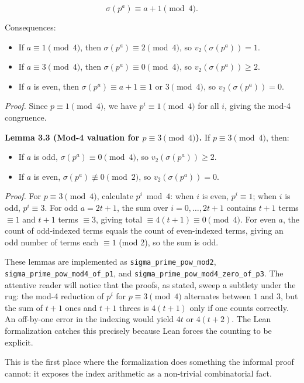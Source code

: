 \documentclass[11pt,a4paper]{article}
\begin{document}
\[\sigma(p^a) \equiv a+1 \pmod{4}.\]

Consequences:

\begin{itemize}
    \item If $a \equiv 1 \pmod{4}$, then $\sigma(p^a) \equiv 2 \pmod{4}$, so $v_2(\sigma(p^a)) = 1$.
    \item If $a \equiv 3 \pmod{4}$, then $\sigma(p^a) \equiv 0 \pmod{4}$, so $v_2(\sigma(p^a)) \ge 2$.
    \item If $a$ is even, then $\sigma(p^a) \equiv a+1 \equiv 1$ or $3 \pmod{4}$, so $v_2(\sigma(p^a)) = 0$.
\end{itemize}

\emph{Proof.} Since $p \equiv 1 \pmod{4}$, we have $p^i \equiv 1 \pmod{4}$ for all $i$, giving the mod-4 congruence.

\textbf{Lemma 3.3 (Mod-4 valuation for $p \equiv 3 \pmod{4}$).} If $p \equiv 3 \pmod{4}$, then:

\begin{itemize}
    \item If $a$ is odd, $\sigma(p^a) \equiv 0 \pmod{4}$, so $v_2(\sigma(p^a)) \ge 2$.
    \item If $a$ is even, $\sigma(p^a) \not\equiv 0 \pmod{2}$, so $v_2(\sigma(p^a)) = 0$.
\end{itemize}

\emph{Proof.} For $p \equiv 3 \pmod{4}$, calculate $p^i \bmod 4$: when $i$ is even, $p^i \equiv 1$; when $i$ is odd, $p^i \equiv 3$. For odd $a = 2t+1$, the sum over $i = 0,\ldots,2t+1$ contains $t+1$ terms $\equiv 1$ and $t+1$ terms $\equiv 3$, giving total $\equiv 4(t+1) \equiv 0 \pmod{4}$. For even $a$, the count of odd-indexed terms equals the count of even-indexed terms, giving an odd number of terms each $\equiv 1$ (mod 2), so the sum is odd.

These lemmas are implemented as \texttt{sigma\_prime\_pow\_mod2}, \texttt{sigma\_prime\_pow\_mod4\_of\_p1}, and \texttt{sigma\_prime\_pow\_mod4\_zero\_of\_p3}. The attentive reader will notice that the proofs, as stated, sweep a subtlety under the rug: the mod-4 reduction of $p^i$ for $p \equiv 3 \pmod{4}$ alternates between $1$ and $3$, but the sum of $t+1$ ones and $t+1$ threes is $4(t+1)$ only if one counts correctly. An off-by-one error in the indexing would yield $4t$ or $4(t+2)$. The Lean formalization catches this precisely because Lean forces the counting to be explicit.

This is the first place where the formalization does something the informal proof cannot: it exposes the index arithmetic as a non-trivial combinatorial fact.
\end{document}
